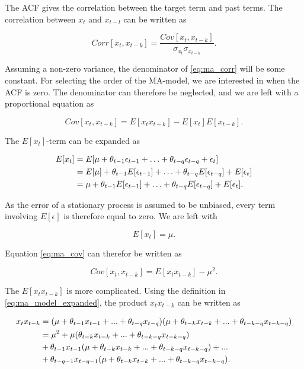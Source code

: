 The ACF gives the correlation between the target term and past terms. The correlation between $x_t$ and $x_{t-l}$ can be written as

\begin{equation}
    Corr[x_t,x_{t-k}]   =   \frac{Cov[x_t,x_{t-k}]}{\sigma_{x_t}\sigma_{x_{t-k}}}
    \label{eq:ma_corr}.
\end{equation}

Assuming a non-zero variance, the denominator of \ref{eq:ma_corr} will be some constant. For selecting the order of the MA-model, we are interested in when the ACF is zero. The denominator can therefore be neglected, and we are left with a proportional equation as

\begin{equation}
    Cov[x_t,x_{t-k}]    =   E[x_t x_{t-k}] - E[x_t] E[x_{t-k}]
    \label{eq:ma_cov}.
\end{equation}

The $E[x_t]$-term can be expanded as

\begin{align}
    E[x_t] & = E[\mu + \theta_{t-1} \epsilon_{t-1} + \ldots + \theta_{t-q} \epsilon_{t-q} + \epsilon_t ] \notag \\
           & = E[\mu] + \theta_{t-1} E[\epsilon_{t-1}] + \ldots + \theta_{t-q} E[\epsilon_{t-q}] + E[\epsilon_t]
    \notag \\
           & = \mu + \theta_{t-1} E[\epsilon_{t-1}] + \ldots + \theta_{t-q} E[\epsilon_{t-q}] + E[\epsilon_t].
\end{align}

As the error of a stationary process is assumed to be unbiased, every term involving $E[\epsilon]$ is therefore equal to zero. We are left with

\begin{equation}
    E[x_t] = \mu.
\end{equation}

Equation \ref{eq:ma_cov} can therefor be written as 

\begin{equation}
    Cov[x_t,x_{t-k}]    =   E[x_t x_{t-k}] - \mu^2
    \label{eq:cov_semi}.
\end{equation}

The $E[x_t x_{t-k}]$ is more complicated. Using the definition in \ref{eq:ma_model_expanded}, the product $x_t x_{t-k}$ can be written as 

\begin{align}
    x_t x_{t-k} &= (\mu +\theta_{t-1} x_{t-1} +...+\theta_{t-q}x_{t-q})(\mu +\theta_{t-k} x_{t-k} +...+\theta_{t-k-q}x_{t-k-q})\notag \\
    &= \mu^2 + \mu(\theta_{t-k} x_{t-k} +...+\theta_{t-k-q}x_{t-k-q})\notag\\
    &+\theta_{t-1}x_{t-1}(\mu+\theta_{t-k} x_{t-k} +...+\theta_{t-k-q}x_{t-k-q})+...\notag\\
    &+\theta_{t-q-1}x_{t-q-1}(\mu+\theta_{t-k} x_{t-k} +...+\theta_{t-k-q}x_{t-k-q})
    \label{eq:cov_product}.
\end{align}

